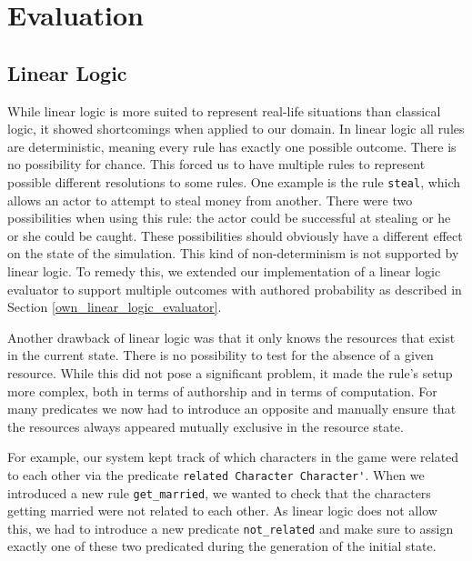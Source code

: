 \section{Evaluation} \label{evaulation}

\subsection{Linear Logic}
While linear logic is more suited to represent real-life situations than classical logic, it showed shortcomings when applied to our domain.
In linear logic all rules are deterministic, meaning every rule has exactly one possible outcome.
There is no possibility for chance.
This forced us to have multiple rules to represent possible different resolutions to some rules.
One example is the rule \lstinline{steal}, which allows an actor to attempt to steal money from another.
There were two possibilities when using this rule: the actor could be successful at stealing or he or she could be caught.
These possibilities should obviously have a different effect on the state of the simulation.
This kind of non-determinism is not supported by linear logic.
To remedy this, we extended our implementation of a linear logic evaluator to support multiple outcomes with authored probability as described in Section \ref{own_linear_logic_evaluator}.

Another drawback of linear logic was that it only knows the resources that exist in the current state.
There is no possibility to test for the absence of a given resource.
While this did not pose a significant problem, it made the rule's setup more complex, both in terms of authorship and in terms of computation.
For many predicates we now had to introduce an opposite and manually ensure that the resources always appeared mutually exclusive in the resource state.

For example, our system kept track of which characters in the game were related to each other via the predicate \lstinline{related Character Character'}.
When we introduced a new rule \lstinline{get_married}, we wanted to check that the characters getting married were not related to each other.
As linear logic does not allow this, we had to introduce a new predicate \lstinline{not_related} and make sure to assign exactly one of these two predicated during the generation of the initial state.

